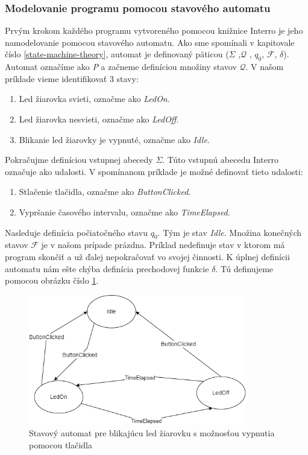 \subsubsection{Modelovanie programu pomocou stavového automatu}
\noindent
Prvým krokom každého programu vytvoreného pomocou knižnice Interro je jeho namodelovanie pomocou stavového automatu.
Ako sme spomínali v kapitovale číslo \ref{state-machine-theory}, automat je definovaný päticou ($\Sigma$ ,$\mathcal{Q}$ , $q_0$, $\mathcal{F}$, $\delta$).
Automat označíme ako \textit{P} a začneme definíciou množiny stavov $\mathcal{Q}$. V našom príklade vieme identifikovať 3 stavy:
\begin{enumerate}
    \item Led žiarovka svieti, označme ako \textit{LedOn}.
    \item Led žiarovka nesvieti, označme ako \textit{LedOff}.
    \item Blikanie led žiarovky je vypnuté, označme ako \textit{Idle}.
\end{enumerate}

Pokračujme definíciou vstupnej abecedy $\Sigma$. Túto vstupnú abecedu Interro označuje ako udalosti. V spomínanom príklade je možné definovať tieto udalosti:
\begin{enumerate}
    \item Stlačenie tlačidla, označme ako \textit{ButtonClicked}.
    \item Vypršanie časového intervalu, označme ako \textit{TimeElapsed}.
\end{enumerate}

Nasleduje definícia počiatočného stavu $q_0$. Tým je stav \textit{Idle}. Množina konečných stavov $\mathcal{F}$ je v našom prípade prázdna. Príklad nedefinuje
stav v ktorom má program skončiť a už ďalej nepokračovať vo svojej činnosti. K úplnej definícii automatu nám ešte chýba definícia prechodovej funkcie $\delta$.
Tú definujeme pomocou obrázku číslo \ref{figure:blinking-led-state-machine}.

\begin{figure}[!h]
    \centering
    \includegraphics[width=0.85\textwidth]{img/blinking-led-state-machine.png}
    \caption{Stavový automat pre blikajúcu led žiarovku s možnosťou vypnutia pomocou tlačidla}
    \label{figure:blinking-led-state-machine}
\end{figure}

